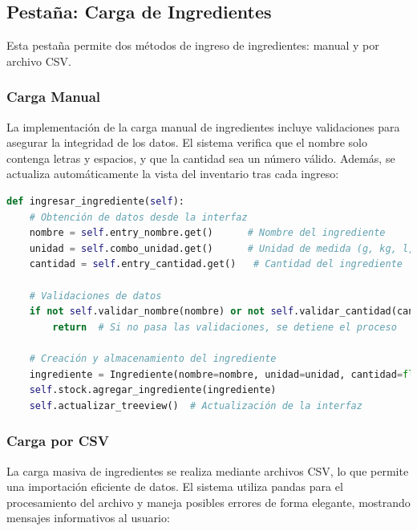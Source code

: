 \documentclass[12pt,letterpaper]{article}
\begin{document}
\subsection{Pestaña: Carga de Ingredientes}
Esta pestaña permite dos métodos de ingreso de ingredientes\@: manual y por archivo CSV\@.

\subsubsection{Carga Manual}
La implementación de la carga manual de ingredientes incluye validaciones para asegurar la integridad de los datos. El sistema verifica que el nombre solo contenga letras y espacios, y que la cantidad sea un número válido. Además, se actualiza automáticamente la vista del inventario tras cada ingreso:

\begin{lstlisting}[language=Python, caption=Implementación de Carga Manual]
def ingresar_ingrediente(self):
    # Obtención de datos desde la interfaz
    nombre = self.entry_nombre.get()      # Nombre del ingrediente
    unidad = self.combo_unidad.get()      # Unidad de medida (g, kg, l, ml, etc.)
    cantidad = self.entry_cantidad.get()   # Cantidad del ingrediente

    # Validaciones de datos
    if not self.validar_nombre(nombre) or not self.validar_cantidad(cantidad):
        return  # Si no pasa las validaciones, se detiene el proceso

    # Creación y almacenamiento del ingrediente
    ingrediente = Ingrediente(nombre=nombre, unidad=unidad, cantidad=float(cantidad))
    self.stock.agregar_ingrediente(ingrediente)
    self.actualizar_treeview()  # Actualización de la interfaz
\end{lstlisting}

\subsubsection{Carga por CSV}
La carga masiva de ingredientes se realiza mediante archivos CSV, lo que permite una importación eficiente de datos. El sistema utiliza pandas para el procesamiento del archivo y maneja posibles errores de forma elegante, mostrando mensajes informativos al usuario:
\end{document}
